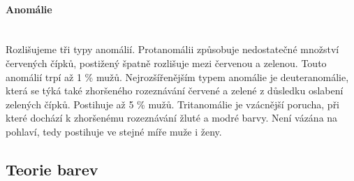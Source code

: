 \paragraph{Anomálie}\mbox{}\\
Rozlišujeme tři typy anomálií. Protanomálii způsobuje nedostatečné množství červených čípků, postižený špatně rozlišuje mezi červenou a zelenou. Touto anomálií trpí
až 1 \% mužů. Nejrozšířenějším typem anomálie je deuteranomálie, která se týká také zhoršeného rozeznávání červené a zelené z důsledku oslabení zelených čípků. Postihuje
až 5 \% mužů. Tritanomálie je vzácnější porucha, při které dochází k zhoršenému rozeznávání žluté a modré barvy. Není vázána na pohlaví, tedy postihuje ve stejné míře muže
i ženy.

\subsection{Teorie barev}


